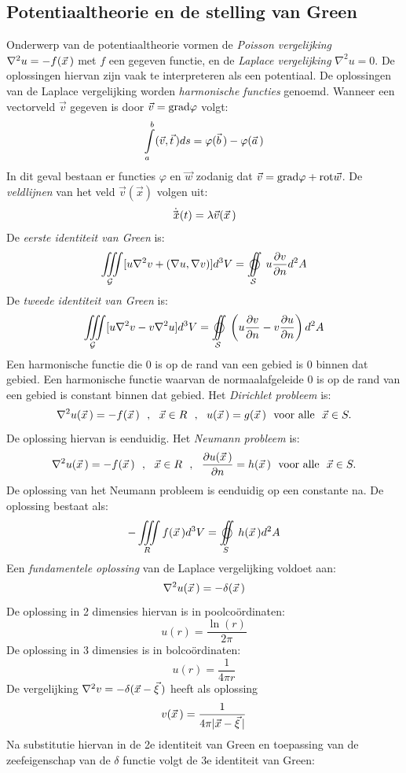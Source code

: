 \documentclass[twoside]{report}
\begin{document}
\subsection{Potentiaaltheorie en de stelling van Green}
Onderwerp van de potentiaaltheorie vormen de {\it Poisson vergelijking}
$\nabla^2u=-f(\vec{x}\,)$ met $f$ een gegeven functie, en de {\it Laplace
vergelijking} $\nabla^2u=0$. De oplossingen hiervan zijn vaak te interpreteren
als een potentiaal. De oplossingen van de Laplace vergelijking worden
{\it harmonische functies} genoemd.
\npar
Wanneer een vectorveld $\vec{v}$ gegeven is door $\vec{v}={\rm grad}\varphi$
volgt:
\[
\int\limits_a^b(\vec{v},\vec{t}\,)ds=\varphi(\vec{b}\,)-\varphi(\vec{a}\,)
\]
In dit geval bestaan er functies $\varphi$ en $\vec{w}$ zodanig dat
$\vec{v}={\rm grad}\varphi+{\rm rot}\vec{w}$.
\npar
De {\it veldlijnen} van het veld $\vec{v}(\vec{x})$ volgen uit:
\[
\dot{\vec{x}\,}(t)=\lambda\vec{v}(\vec{x}\,)
\]
De {\it eerste identiteit van Green} is:
\[
\mathop{\iiint}\limits_{\cal\!\!\! G}[u\nabla^2v+(\nabla u,\nabla v)]d^3V=\mathop{\oiint}\limits_{\cal\!\!\!S}u\Q{v}{n}d^2A
\]
De {\it tweede identiteit van Green} is:
\[
\mathop{\iiint}\limits_{\cal\!\!\! G}[u\nabla^2v-v\nabla^2u]d^3V=\mathop{\oiint}\limits_{\cal\!\!\!S}\left(u\Q{v}{n}-v\Q{u}{n}\right)d^2A
\]
Een harmonische functie die 0 is op de rand van een gebied is 0 binnen dat
gebied. Een harmonische functie waarvan de normaalafgeleide 0 is op de rand van
een gebied is constant binnen dat gebied.
\npar
Het {\it Dirichlet probleem} is:
\[
\nabla^2u(\vec{x}\,)=-f(\vec{x}\,)~~,~~\vec{x}\in R~~,~~u(\vec{x}\,)=g(\vec{x}\,)~~\mbox{voor alle}~~\vec{x}\in S.
\]
De oplossing hiervan is eenduidig.
\npar
Het {\it Neumann probleem} is:
\[
\nabla^2u(\vec{x}\,)=-f(\vec{x}\,)~~,~~\vec{x}\in R~~,~~\frac{\partial u(\vec{x}\,)}{\partial n}=h(\vec{x}\,)~~\mbox{voor alle}~~\vec{x}\in S.
\]
De oplossing van het Neumann probleem is eenduidig op een constante na. De
oplossing bestaat als:
\[
-\mathop{\iiint}\limits_{\!\!\!R}f(\vvec{x})d^3V=\mathop{\oiint}\limits_{\!\!\!S}h(\vvec{x})d^2A
\]
Een {\it fundamentele oplossing} van de Laplace vergelijking voldoet aan:
\[
\nabla^2u(\vec{x}\,)=-\delta(\vec{x}\,)
\]
De oplossing in 2 dimensies hiervan is in poolco\"ordinaten:
\[
u(r)=\frac{\ln(r)}{2\pi}
\]
De oplossing in 3 dimensies is in bolco\"ordinaten:
\[
u(r)=\frac{1}{4\pi r}
\]
De vergelijking $\nabla^2v=-\delta(\vec{x}-\vec{\xi}\,)$ heeft als oplossing
\[
v(\vec{x}\,)=\frac{1}{4\pi|\vec{x}-\vec{\xi}\,|}
\]
Na substitutie hiervan in de 2e identiteit van Green en toepassing van de
zeefeigenschap van de $\delta$ functie volgt de 3e identiteit van Green:
\end{document}

